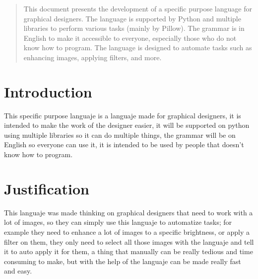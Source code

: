 \begin{abstract} %
    This document presents the development of a specific purpose language for graphical designers. The language is supported by Python and multiple libraries to perform various tasks (mainly by Pillow). The grammar is in English to make it accessible to everyone, especially those who do not know how to program. The language is designed to automate tasks such as enhancing images, applying filters, and more.
\end{abstract}
\section{Introduction}
This specific purpose languaje is a languaje made for graphical 
designers, it is intended to make the work of the designer easier, 
it will be supported on python using multiple libraries so it can 
do multiple things, the grammar will be on English so everyone can 
use it, it is intended to be used by people that doesn't know how 
to program.
\section{Justification}
This languaje was made thinking on graphical designers that need 
to work with a lot of images, so they can simply use this languaje 
to automatize tasks; for example they need to enhance a lot of 
images to a specific brightness, or apply a filter on them, they 
only need to select all those images with the languaje and tell it 
to auto apply it for them, a thing that manually can be really 
tedious and time consuming to make, but with the help of the 
languaje can be made really fast and easy.